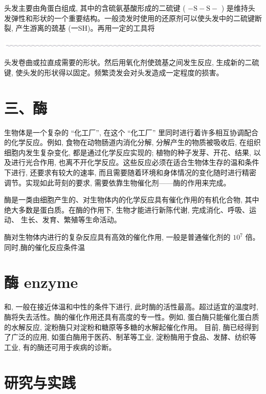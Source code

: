 \documentclass[10pt]{article}
\begin{document}
头发主要由角蛋白组成, 其中的含硫氨基酸形成的二硫键 ( \(- \mathrm{S} - \mathrm{S} -\) ) 是维持头发弹性和形状的一个重要结构。一般烫发时使用的还原剂可以使头发中的二硫键断裂, 产生游离的巯基 (一SH)。再用一定的工具将

\begin{center}
\includegraphics[max width=1.0\textwidth]{images/0190efc5-b58a-7c43-bfb0-e0a030df9cfd_123_616473.jpg}
\end{center}

头发卷曲或拉直成需要的形状。然后用氧化剂使巯基之间发生反应, 生成新的二硫键, 使头发的形状得以固定。频繁烫发会对头发造成一定程度的损害。

\section*{三、酶}

生物体是一个复杂的 “化工厂”, 在这个 “化工厂” 里同时进行着许多相互协调配合的化学反应。例如, 食物在动物肠道内消化分解, 分解产生的物质被吸收后, 在组织细胞内发生复杂变化, 都是通过化学反应实现的; 植物的种子发芽、开花、结果, 以及进行光合作用, 也离不开化学反应。这些反应必须在适合生物体生存的温和条件下进行, 还要求有较大的速率, 而且需要随着环境和身体情况的变化随时进行精密调节。实现如此苛刻的要求, 需要依靠生物催化剂——酶的作用来完成。

酶是一类由细胞产生的、对生物体内的化学反应具有催化作用的有机化合物, 其中绝大多数是蛋白质。在酶的作用下, 生物才能进行新陈代谢, 完成消化、呼吸、运动、 生长、发育、繁殖等生命活动。

酶对生物体内进行的复杂反应具有高效的催化作用, 一般是普通催化剂的 \({10}^{7}\) 倍。同时,酶的催化反应条件温

\section*{酶 enzyme}

和, 一般在接近体温和中性的条件下进行, 此时酶的活性最高。超过适宜的温度时, 酶将失去活性。酶的催化作用还具有高度的专一性。例如, 蛋白酶只能催化蛋白质的水解反应, 淀粉酶只对淀粉和糖原等多糖的水解起催化作用。 目前, 酶已经得到了广泛的应用, 如蛋白酶用于医药、制革等工业, 淀粉酶用于食品、发酵、纺织等工业, 有的酶还可用于疾病的诊断。

\section*{研究与实践}
\end{document}
